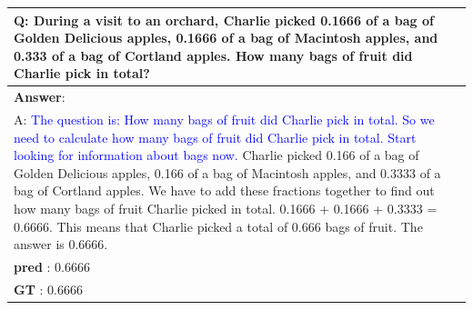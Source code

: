 \documentclass[11pt]{article}
\begin{document}
\begin{table}[!h]
\begin{tabularx}{\textwidth}{X}
Q: During a visit to an orchard, Charlie picked 0.1666 of a bag of Golden Delicious apples, 0.1666 of a bag of Macintosh apples, and 0.333 of a bag of Cortland apples. How many bags of fruit did Charlie pick in total?\\
        \midrule
\textbf{Answer}:\\
A:
\textcolor{blue}{ The question is: How many bags of fruit did Charlie pick in total. So we need to calculate how many bags of fruit did Charlie pick in total. Start looking for information about bags now.} Charlie picked 0.166 of a bag of Golden Delicious apples, 0.166 of a bag of Macintosh apples, and 0.3333 of a bag of Cortland apples. We have to add these fractions together to find out how many bags of fruit Charlie picked in total. 0.1666 + 0.1666 + 0.3333 = 0.6666. This means that Charlie picked a total of 0.666 bags of fruit. The answer is 0.6666.\\
\textbf{pred} : 0.6666\\
\textbf{GT} : 0.6666\\
    \bottomrule

\end{tabularx}

%

\end{table}
\end{document}
